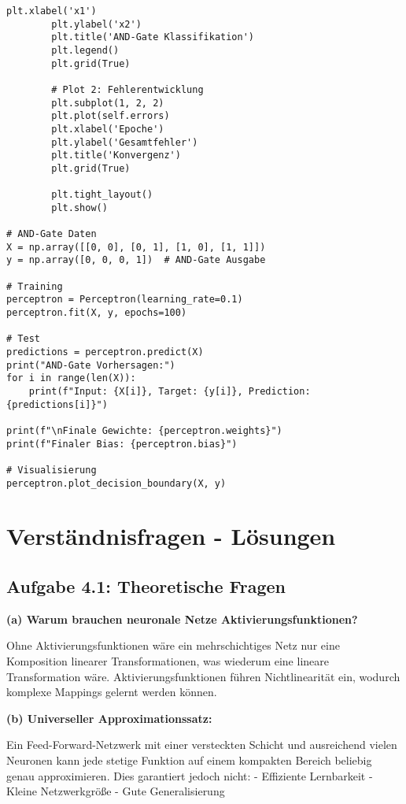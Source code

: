 \documentclass[12pt,a4paper]{article}
\begin{document}
\begin{lstlisting}[caption=Perceptron-Implementierung]
        plt.xlabel('x1')
        plt.ylabel('x2')
        plt.title('AND-Gate Klassifikation')
        plt.legend()
        plt.grid(True)
        
        # Plot 2: Fehlerentwicklung
        plt.subplot(1, 2, 2)
        plt.plot(self.errors)
        plt.xlabel('Epoche')
        plt.ylabel('Gesamtfehler')
        plt.title('Konvergenz')
        plt.grid(True)
        
        plt.tight_layout()
        plt.show()

# AND-Gate Daten
X = np.array([[0, 0], [0, 1], [1, 0], [1, 1]])
y = np.array([0, 0, 0, 1])  # AND-Gate Ausgabe

# Training
perceptron = Perceptron(learning_rate=0.1)
perceptron.fit(X, y, epochs=100)

# Test
predictions = perceptron.predict(X)
print("AND-Gate Vorhersagen:")
for i in range(len(X)):
    print(f"Input: {X[i]}, Target: {y[i]}, Prediction: {predictions[i]}")

print(f"\nFinale Gewichte: {perceptron.weights}")
print(f"Finaler Bias: {perceptron.bias}")

# Visualisierung
perceptron.plot_decision_boundary(X, y)
\end{lstlisting}

\section{Verständnisfragen - Lösungen}

\subsection{Aufgabe 4.1: Theoretische Fragen}

\textbf{(a) Warum brauchen neuronale Netze Aktivierungsfunktionen?}

Ohne Aktivierungsfunktionen wäre ein mehrschichtiges Netz nur eine Komposition linearer Transformationen, was wiederum eine lineare Transformation wäre. Aktivierungsfunktionen führen Nichtlinearität ein, wodurch komplexe Mappings gelernt werden können.

\textbf{(b) Universeller Approximationssatz:}

Ein Feed-Forward-Netzwerk mit einer versteckten Schicht und ausreichend vielen Neuronen kann jede stetige Funktion auf einem kompakten Bereich beliebig genau approximieren. Dies garantiert jedoch nicht:
- Effiziente Lernbarkeit
- Kleine Netzwerkgröße
- Gute Generalisierung
\end{document}
